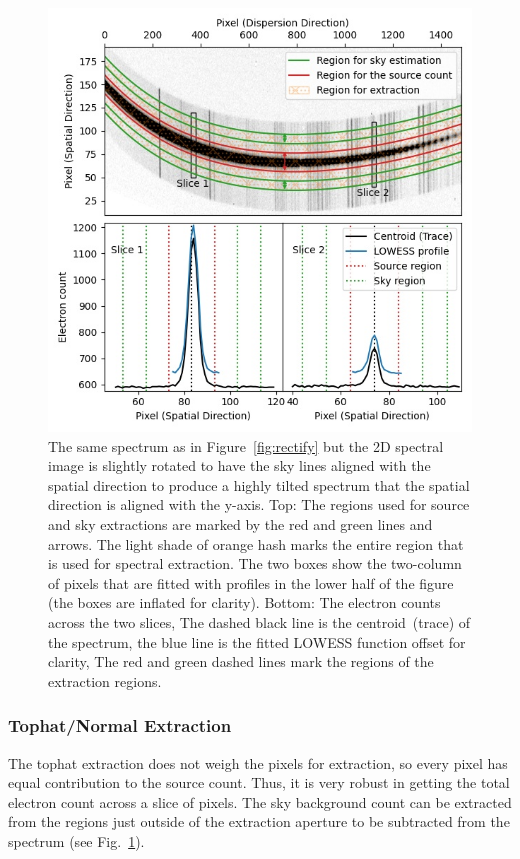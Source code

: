 \documentclass[fleqn,usenatbib]{mnras}
\begin{document}
\begin{figure}
    \centering
    \includegraphics[width=\columnwidth]{fig_03_extraction_profile.jpg}
    \caption{The same spectrum as in Figure~\ref{fig:rectify} but the
    2D spectral image is slightly rotated to have the sky lines
    aligned with the spatial direction to produce a highly tilted
    spectrum that the spatial direction is aligned with the y-axis.
    Top: The regions used for source and sky extractions are marked
    by the red and green lines and arrows. The light shade of orange
    hash marks the entire region that is used for spectral extraction.
    The two boxes show the two-column of pixels that are fitted with
    profiles in the lower half of the figure (the boxes are inflated
    for clarity). Bottom: The electron counts across the two slices,
    The dashed black line is the centroid~(trace) of the spectrum,
    the blue line is the fitted LOWESS function offset for clarity,
    The red and green dashed lines mark the regions of the extraction
    regions.}
    \label{fig:extract}
\end{figure}

\subsubsection*{Tophat/Normal Extraction}
The tophat extraction does not weigh the pixels for extraction,
so every pixel has equal contribution to the source count. Thus,
it is very robust in getting the total electron count across
a slice of pixels. The sky background count can be extracted
from the regions just outside of the extraction aperture to be
subtracted from the spectrum (see Fig.~\ref{fig:extract}).
\end{document}
